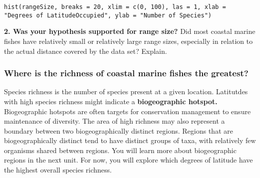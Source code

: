 \documentclass[11pt]{article}
\begin{document}
\texttt{hist(rangeSize, breaks = 20, xlim = c(0, 100), las = 1, xlab = "Degrees of Latitude\newline Occupied", ylab = "Number of Species")}


\bigskip\bigskip

\textbf{2. Was your hypothesis supported for range size?} Did most coastal marine
fishes have relatively small or relatively large range sizes, especially
in relation to the actual distance covered by the data set? Explain.



\newpage


\subsubsection*{Where is the richness of coastal marine fishes the greatest?}

Species richness is the number of species present at a given location.
Latitutdes with high species richness might indicate a \textbf{biogeographic hotspot.} Biogeographic
hotspots are often targets for conservation management to ensure
maintenance of diversity. The area of high richness may also represent a
boundary between two biogeographically distinct regions. Regions that
are biogeographically distinct tend to have distinct groups of taxa,
with relatively few organisms shared between regions. You will learn
more about biogeographic regions in the next unit. For now, you will
explore which degrees of latitude have the highest overall species
richness.
\end{document}
